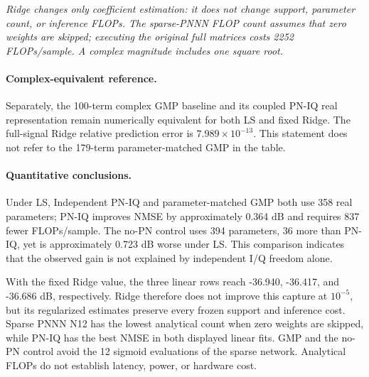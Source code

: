 \documentclass[10pt]{article}
\begin{document}
\begin{center}
\begin{minipage}{0.97\linewidth}
\footnotesize
\textit{Ridge changes only coefficient estimation: it does not change support,
parameter count, or inference FLOPs. The sparse-PNNN FLOP count assumes that
zero weights are skipped; executing the original full matrices costs 2252
FLOPs/sample. A complex magnitude includes one square root.}
\end{minipage}
\end{center}

\paragraph{Complex-equivalent reference.}
Separately, the 100-term complex GMP baseline and its coupled PN-IQ real
representation remain numerically equivalent for both LS and fixed Ridge. The
full-signal Ridge relative prediction error is $7.989\times10^{-13}$. This
statement does not refer to the 179-term parameter-matched GMP in the table.

\paragraph{Quantitative conclusions.}
Under LS, Independent PN-IQ and parameter-matched GMP both use 358 real
parameters; PN-IQ improves NMSE by approximately 0.364 dB and requires 837
fewer FLOPs/sample. The no-PN control uses 394 parameters, 36 more than PN-IQ,
yet is approximately 0.723 dB worse under LS. This comparison indicates that
the observed gain is not explained by independent I/Q freedom alone.

With the fixed Ridge value, the three linear rows reach -36.940, -36.417, and
-36.686 dB, respectively. Ridge therefore does not improve this capture at
$10^{-5}$, but its regularized estimates preserve every frozen support and
inference cost. Sparse PNNN N12 has the lowest analytical count when zero
weights are skipped, while PN-IQ has the best NMSE in both displayed linear
fits. GMP and the no-PN control avoid the 12 sigmoid evaluations of the sparse
network. Analytical FLOPs do not establish latency, power, or hardware cost.
\end{document}
